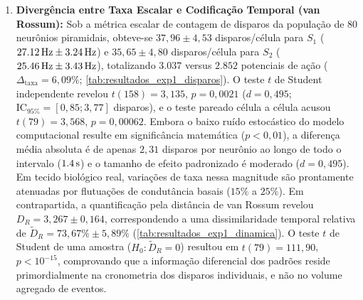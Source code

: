 \documentclass[11pt,a4paper,article,brazil]{abntex2}
\begin{document}
\begin{enumerate}
    \item \textbf{Divergência entre Taxa Escalar e Codificação Temporal (van Rossum):} Sob a métrica escalar de contagem de disparos da população de 80 neurônios piramidais, obteve-se $37{,}96 \pm 4{,}53$ disparos/célula para $S_1$ ($\qty{27{,}12}{\hertz} \pm \qty{3{,}24}{\hertz}$) e $35{,}65 \pm 4{,}80$ disparos/célula para $S_2$ ($\qty{25{,}46}{\hertz} \pm \qty{3{,}43}{\hertz}$), totalizando $3.037$ versus $2.852$ potenciais de ação ($\Delta_{\text{taxa}} = 6{,}09\%$; \cref{tab:resultados_exp1_disparos}). O teste $t$ de Student independente revelou $t(158) = 3{,}135$, $p = 0{,}0021$ ($d = 0{,}495$; $\text{IC}_{95\%} = [0{,}85; 3{,}77]$ disparos), e o teste pareado célula a célula acusou $t(79) = 3{,}568$, $p = 0{,}00062$. Embora o baixo ruído estocástico do modelo computacional resulte em significância matemática ($p < 0{,}01$), a diferença média absoluta é de apenas $2{,}31$ disparos por neurônio ao longo de todo o intervalo ($\qty{1{,}4}{\second}$) e o tamanho de efeito padronizado é moderado ($d = 0{,}495$). Em tecido biológico real, variações de taxa nessa magnitude são prontamente atenuadas por flutuações de condutância basais ($15\%$ a $25\%$). Em contrapartida, a quantificação pela distância de van Rossum revelou $D_R = 3{,}267 \pm 0{,}164$, correspondendo a uma dissimilaridade temporal relativa de $\tilde{D}_R = 73{,}67\% \pm 5{,}89\%$ (\cref{tab:resultados_exp1_dinamica}). O teste $t$ de Student de uma amostra ($H_0: \tilde{D}_R = 0$) resultou em $t(79) = 111{,}90$, $p < 10^{-15}$, comprovando que a informação diferencial dos padrões reside primordialmente na cronometria dos disparos individuais, e não no volume agregado de eventos.
\end{enumerate}
\end{document}
